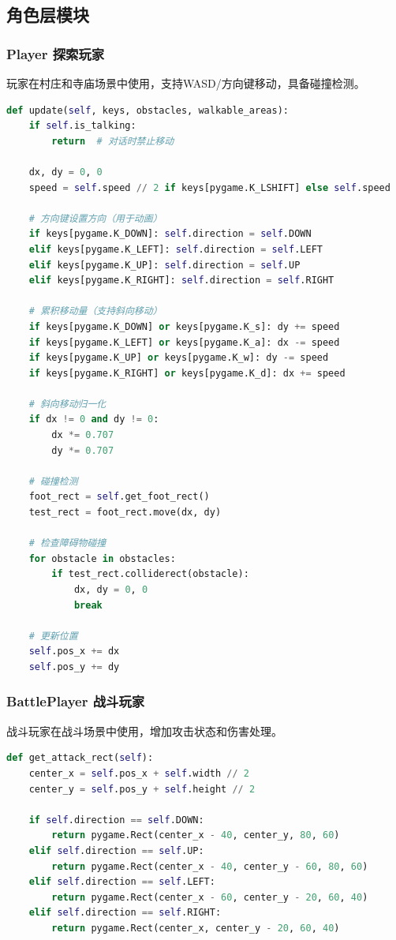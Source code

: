 \documentclass[12pt,a4paper]{article}
\begin{document}
\subsection{角色层模块}

\subsubsection{Player 探索玩家}

玩家在村庄和寺庙场景中使用，支持WASD/方向键移动，具备碰撞检测。

\begin{lstlisting}[language=Python,caption={Player移动算法}]
def update(self, keys, obstacles, walkable_areas):
    if self.is_talking:
        return  # 对话时禁止移动

    dx, dy = 0, 0
    speed = self.speed // 2 if keys[pygame.K_LSHIFT] else self.speed

    # 方向键设置方向（用于动画）
    if keys[pygame.K_DOWN]: self.direction = self.DOWN
    elif keys[pygame.K_LEFT]: self.direction = self.LEFT
    elif keys[pygame.K_UP]: self.direction = self.UP
    elif keys[pygame.K_RIGHT]: self.direction = self.RIGHT

    # 累积移动量（支持斜向移动）
    if keys[pygame.K_DOWN] or keys[pygame.K_s]: dy += speed
    if keys[pygame.K_LEFT] or keys[pygame.K_a]: dx -= speed
    if keys[pygame.K_UP] or keys[pygame.K_w]: dy -= speed
    if keys[pygame.K_RIGHT] or keys[pygame.K_d]: dx += speed

    # 斜向移动归一化
    if dx != 0 and dy != 0:
        dx *= 0.707
        dy *= 0.707

    # 碰撞检测
    foot_rect = self.get_foot_rect()
    test_rect = foot_rect.move(dx, dy)

    # 检查障碍物碰撞
    for obstacle in obstacles:
        if test_rect.colliderect(obstacle):
            dx, dy = 0, 0
            break

    # 更新位置
    self.pos_x += dx
    self.pos_y += dy
\end{lstlisting}

\subsubsection{BattlePlayer 战斗玩家}

战斗玩家在战斗场景中使用，增加攻击状态和伤害处理。

\begin{lstlisting}[language=Python,caption={攻击范围计算}]
def get_attack_rect(self):
    center_x = self.pos_x + self.width // 2
    center_y = self.pos_y + self.height // 2

    if self.direction == self.DOWN:
        return pygame.Rect(center_x - 40, center_y, 80, 60)
    elif self.direction == self.UP:
        return pygame.Rect(center_x - 40, center_y - 60, 80, 60)
    elif self.direction == self.LEFT:
        return pygame.Rect(center_x - 60, center_y - 20, 60, 40)
    elif self.direction == self.RIGHT:
        return pygame.Rect(center_x, center_y - 20, 60, 40)
\end{lstlisting}
\end{document}
